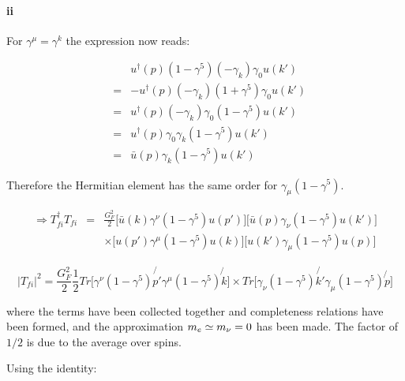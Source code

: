 \paragraph{ii} For $\gamma^{\mu} = \gamma^{k}$ the expression now reads:

\begin{eqnarray*}
  && u^{\dagger}(p)\left(1 - \gamma^5\right)\left(-\gamma_k\right)\gamma_0u(k') \\
  & = & -u^{\dagger}(p)(-\gamma_k)\left(1 + \gamma^5\right)\gamma_0 u(k') \\
  & = & u^{\dagger}(p)(-\gamma_k)\gamma_0\left(1 - \gamma^5\right)u(k') \\
  & = & u^{\dagger}(p)\gamma_0\gamma_k\left(1 - \gamma^5\right)u(k') \\
  & = & \bar{u}(p)\gamma_k\left(1 - \gamma^5\right)u(k')
\end{eqnarray*}

Therefore the Hermitian element has the same order for $\gamma_{\mu}\left(1 - \gamma^5\right)$.

\begin{eqnarray*}
  \Rightarrow T_{fi}^{\dagger}T_{fi} & = & \frac{G_F^2}{2}\Big[\bar{u}(k)\gamma^{\nu}\left(1 - \gamma^5\right)u(p')\Big]\Big[\bar{u}(p)\gamma_{\nu}\left(1 - \gamma^5\right)u(k')\Big] \\
  & & \times \Big[u(p')\gamma^{\mu}\left(1 - \gamma^5\right)u(k)\Big]\Big[u(k')\gamma_{\mu}\left(1 - \gamma^5\right)u(p)\Big]
\end{eqnarray*}

\[
  |T_{fi}|^2 = \frac{G_F^2}{2}\frac{1}{2}Tr\Big[\gamma^{\nu}\left(1 - \gamma^5\right)\not{p'}\gamma^{\mu}\left(1 - \gamma^5\right)\not{k}\Big]\times Tr\Big[\gamma_{\nu}\left(1 - \gamma^5\right)\not{k'}\gamma_{\mu}\left(1 - \gamma^5\right)\not{p}\Big]
\]

where the terms have been collected together and completeness relations have been formed, and the approximation $m_{e} \simeq m_{\nu} = 0$ has been made.  The factor of $1/2$ is due to the average over spins.

Using the identity:

